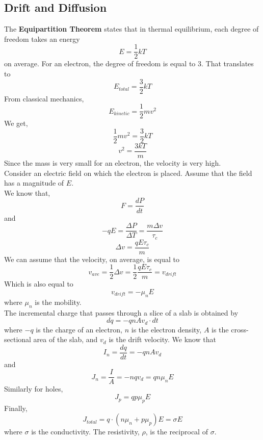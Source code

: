 \documentclass{article}
\begin{document}
\newpage 
\subsection{Drift and Diffusion}
\noindent 
The \textbf{Equipartition Theorem} states that in thermal equilibrium, each
degree of freedom takes an energy $$E = \frac{1}{2}kT$$ on average. For an electron, 
the degree of freedom is equal to 3. That translates to $$E_{total} = \frac{3}{2}kT$$
From classical mechanics, $$E_{kinetic}=\frac{1}{2}mv^2$$ 
We get, $$\frac{1}{2}mv^2 = \frac{3}{2}kT$$ $$v^2 = \frac{3kT}{m}$$ Since the mass 
is very small for an electron, the velocity is very high. 
\vspace{8pt}
\\ Consider an electric field on which the electron is placed. Assume that the field 
has a magnitude of $E$. 
\vspace{8pt}
\\We know that, $$F = \frac{dP}{dt}$$ and $$-qE = \frac{\Delta P}{\Delta T} 
= \frac{m\Delta v}{\tau_{c}}$$ $$\boxed{\Delta v = \frac{qE \tau_c}{m}}$$ We can assume 
that the velocity, on average, is equal to $$\boxed{v_{ave} = \frac{1}{2} \Delta v = 
\frac{1}{2} \frac{qE \tau_c}{m} = v_{drift}}$$
Which is also equal to $$\boxed{v_{drift} = -\mu_n E}$$ where $\mu_n$ is the mobility.
\vspace{8pt}
\\ The incremental charge that passes through a slice of a slab is obtained by 
$$dq = -qnAv_d \cdot dt$$
where $-q$ is the charge of an electron, $n$ is the electron density, $A$ is the 
cross-sectional area of the slab, and $v_d$ is the drift velocity. We know that 
$$I_n = \frac{dq}{dt} = -qnAv_{d}$$ and $$J_n = \frac{I}{A} =-nqv_d = qn\mu_n E$$
Similarly for holes, $$J_p = qp\mu_p E$$
Finally, $$\boxed{J_{total} = q\cdot(n\mu_n + p\mu_p)E = \sigma E}$$
where $\sigma$ is the conductivity. The resistivity, $\rho$, is the reciprocal of $\sigma$.
\end{document}
